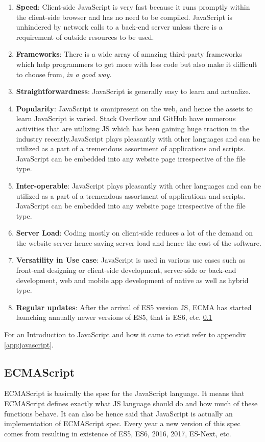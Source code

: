 \begin{enumerate}
\item \textbf{Speed}: Client-side JavaScript is very fast because it runs promptly within the client-side browser and has no need to be compiled. JavaScript is unhindered by network calls to a back-end server unless there is a requirement of outside resources to be used.
\item \textbf{Frameworks}: There is a wide array of amazing third-party frameworks which help programmers to get more with less code but also make it difficult to choose from, \emph{in a good way}.
\item \textbf{Straightforwardness}: JavaScript is generally easy to learn and actualize.
\item \textbf{Popularity}: JavaScript is omnipresent on the web, and hence the assets to learn JavaScript is varied. Stack Overflow and GitHub have numerous activities that are utilizing JS which has been gaining huge traction in the industry recently.JavaScript plays pleasantly with other languages and can be utilized as a part of a tremendous assortment of applications and scripts. JavaScript can be embedded into any website page irrespective of the file type. 
\item \textbf{Inter-operable}: JavaScript plays pleasantly with other languages and can be utilized as a part of a tremendous assortment of applications and scripts. JavaScript can be embedded into any website page irrespective of the file type. 
\item \textbf{Server Load}: Coding mostly on client-side reduces a lot of the demand on the website server hence saving server load and hence the cost of the software.
\item \textbf{Versatility in Use case}: JavaScript is used in various use cases such as front-end designing or client-side development, server-side or back-end development, web and mobile app development of native as well as hybrid type.
\item \textbf{Regular updates}: After the arrival of ES5 version JS, ECMA has started launching annually newer versions of ES5, that is ES6, etc. \ref{sec:ecma}
\end{enumerate}

For an Introduction to JavaScript and how it came to exist refer to appendix \ref{app:javascript}.

\subsection {ECMAScript}
\label{sec:ecma}
ECMAScript is basically the spec for the JavaScript language. It means that ECMAScript defines exactly what JS language should do and how much of these functions behave.
It can also be hence said that JavaScript is actually an implementation of ECMAScript spec. Every year a new version of this spec comes from resulting in existence of ES5, ES6, 2016, 2017, ES-Next, etc.

